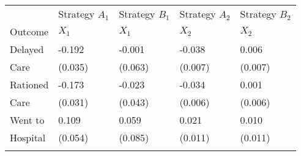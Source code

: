 \documentclass{article}
\begin{document}
\begin{table}[tbp] \centering
{}

{\normalsize
\begin{tabularx}{\textwidth}{C|CC|CC}

\toprule
  & Strategy \(A_1\) & Strategy \(B_1\) & Strategy \(A_2\) & Strategy \(B_2\) \\ Outcome & \( X_1 \) & \( X_1 \) & \( X_2 \) & \( X_2 \) \tabularnewline
\midrule\addlinespace[1.5ex]
\midrule \midrule Delayed&-0.192&-0.001&-0.038&0.006 \tabularnewline \addlinespace[.05in]
Care&(0.035)&(0.063)&(0.007)&(0.007) \tabularnewline \addlinespace[.05in]
\midrule Rationed&-0.173&-0.023&-0.034&0.001 \tabularnewline \addlinespace[.05in]
Care&(0.031)&(0.043)&(0.006)&(0.006) \tabularnewline \addlinespace[.05in]
\midrule Went to&0.109&0.059&0.021&0.010 \tabularnewline \addlinespace[.05in]
Hospital&(0.054)&(0.085)&(0.011)&(0.011) \tabularnewline \addlinespace[.05in]
\bottomrule \addlinespace[1.5ex]

\end{tabularx}
}
\end{table}
\end{document}
